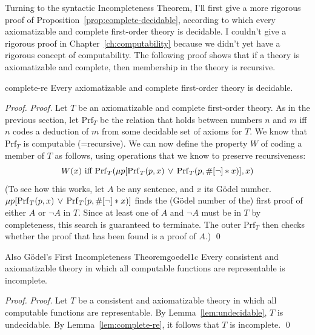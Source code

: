 Turning to the syntactic Incompleteness Theorem,
I'll first give a more rigorous proof of Proposition~\ref{prop:complete-decidable},
according to which
every axiomatizable and complete first-order theory is decidable.
I couldn't give a rigorous proof in Chapter~\ref{ch:computability}
because we didn't yet have a rigorous concept of computability.
The following proof shows that
if a theory is axiomatizable and complete,
then membership in the theory is recursive.

\begin{lemma}{}{complete-re}
  Every axiomatizable and complete first-order theory is decidable.
\end{lemma}
\begin{proof}
  \emph{Proof.}
  Let $T$ be an axiomatizable and complete first-order theory.
  As in the previous section,
  let $\mathrm{Prf}_T$ be the relation that holds between numbers $n$ and $m$
  iff $n$ codes a deduction of $m$ from some decidable set of axioms for $T$.
  We know that $\mathrm{Prf}_T$ is computable (=recursive).
  We can now define the property $W$ of coding a member of $T$ as follows,
  using operations that we know to preserve recursiveness:
  \[
    W(x) \text{ iff }
    \mathrm{Prf}_T(
    \mu p[\mathrm{Prf}_T(p, x) \,\lor\, \mathrm{Prf}_T(p, \#[\neg] * x)], x)
  \]
  (To see how this works,
  let $A$ be any sentence,
  and $x$ its Gödel number.
  $\mu p[{\mathrm{Prf}_T(p, x)} \,\lor\, \mathrm{Prf}_T(p, \#[\neg] * x)]$
  finds the (Gödel number of the) first proof of either $A$ or $\neg A$ in $T$.
  Since at least one of $A$ and $\neg A$ must be in $T$ by completeness,
  this search is guaranteed to terminate.
  The outer $\mathrm{Prf}_T$ then checks whether the proof that has been found is a proof of $A$.)
  \qed
\end{proof}

\begin{theorem}{Also Gödel's First Incompleteness Theorem}{goedel1c}
  Every consistent and axiomatizable theory in which
  all computable functions are representable is incomplete.
\end{theorem}
\begin{proof}
  \emph{Proof.}
  Let $T$ be a consistent and axiomatizable theory in which
  all computable functions are representable.
  By Lemma~\ref{lem:undecidable},
  $T$ is undecidable.
  By Lemma~\ref{lem:complete-re},
  it follows that $T$ is incomplete.
  \qed
\end{proof}

